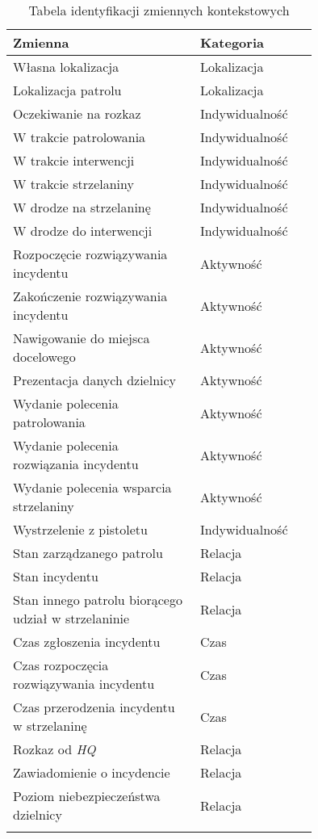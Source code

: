 \begin{longtable}{|p{0.5\linewidth}|p{0.25\linewidth}|}
    \hline
     Zmienna & Kategoria \\
     \hline
     \hline
     Własna lokalizacja & Lokalizacja \\
     \hline
     Lokalizacja patrolu & Lokalizacja \\
     \hline
     Oczekiwanie na rozkaz & Indywidualność \\
     \hline
     W trakcie patrolowania & Indywidualność \\
     \hline
     W trakcie interwencji & Indywidualność \\
     \hline
     W trakcie strzelaniny & Indywidualność \\
     \hline
     W drodze na strzelaninę & Indywidualność \\
     \hline
     W drodze do interwencji & Indywidualność \\
     \hline
     Rozpoczęcie rozwiązywania incydentu & Aktywność \\
     \hline
     Zakończenie rozwiązywania incydentu & Aktywność \\
     \hline
     Nawigowanie do miejsca docelowego & Aktywność \\
     \hline
     Prezentacja danych dzielnicy & Aktywność \\
     \hline
     Wydanie polecenia patrolowania & Aktywność \\
     \hline
     Wydanie polecenia rozwiązania incydentu & Aktywność \\
     \hline
     Wydanie polecenia wsparcia strzelaniny & Aktywność \\
     \hline
     Wystrzelenie z pistoletu & Indywidualność \\
     \hline
     Stan zarządzanego patrolu & Relacja \\
     \hline
     Stan incydentu & Relacja \\
     \hline
     Stan innego patrolu biorącego udział w strzelaninie & Relacja \\
     \hline
     Czas zgłoszenia incydentu & Czas \\
     \hline
     Czas rozpoczęcia rozwiązywania incydentu & Czas \\
     \hline
      Czas przerodzenia incydentu w strzelaninę & Czas \\
     \hline
      Rozkaz od \emph{HQ} & Relacja \\
     \hline
     Zawiadomienie o incydencie & Relacja \\
     \hline
     Poziom niebezpieczeństwa dzielnicy & Relacja \\
     \hline
\caption{Tabela identyfikacji zmiennych kontekstowych}
\label{tab:agentsFeaturesCategorization}
\end{longtable}

